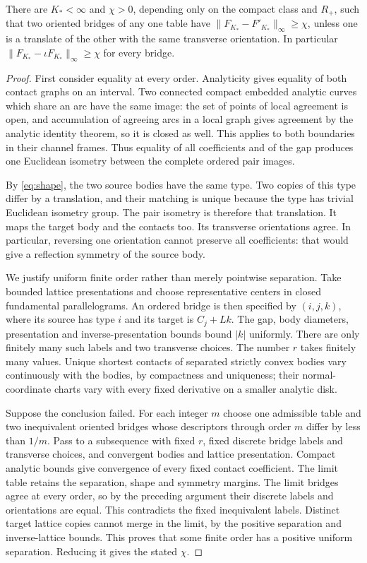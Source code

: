 \begin{lemma}
\label{lem:finite-separation}
There are $K_*<\infty$ and $\chi>0$, depending only on the compact
class and $R_+$, such that two oriented bridges of any one table have
$\|F_{K_*}-F'_{K_*}\|_\infty\ge\chi$, unless one is a translate
of the other with the same transverse orientation. In particular
$\|F_{K_*}-\iota F_{K_*}\|_\infty\ge\chi$ for every bridge.
\end{lemma}
\begin{proof}
First consider equality at every order. Analyticity gives equality of
both contact graphs on an interval. Two connected compact embedded
analytic curves which share an arc have the same image: the set of
points of local agreement is open, and accumulation of agreeing arcs
in a local graph gives agreement by the analytic identity theorem, so
it is closed as well. This applies to both boundaries in their channel
frames. Thus equality of all coefficients and of the gap produces one
Euclidean isometry between the complete ordered pair images.

By \eqref{eq:shape}, the two source bodies have the same type. Two
copies of this type differ by a translation, and their matching is
unique because the type has trivial Euclidean isometry group. The pair
isometry is therefore that translation. It maps the target body and the
contacts too. Its transverse orientations agree. In particular, reversing
one orientation cannot preserve all coefficients: that would give a
reflection symmetry of the source body.

We justify uniform finite order rather than merely pointwise separation.
Take bounded lattice presentations and choose representative centers in
closed fundamental parallelograms. An ordered bridge is then specified
by $(i,j,k)$, where its source has type $i$ and its target is $C_j+Lk$.
The gap, body diameters, presentation and inverse-presentation bounds
bound $|k|$ uniformly. There are only finitely many such labels and
two transverse choices. The number $r$ takes finitely many values.
Unique shortest contacts of separated strictly convex bodies vary
continuously with the bodies, by compactness and uniqueness; their
normal-coordinate charts vary with every fixed derivative on a smaller
analytic disk.

Suppose the conclusion failed. For each integer $m$ choose one admissible
table and two inequivalent oriented bridges whose descriptors through
order $m$ differ by less than $1/m$. Pass to a subsequence with fixed
$r$, fixed discrete bridge labels and transverse choices, and convergent
bodies and lattice presentation. Compact analytic bounds give convergence
of every fixed contact coefficient. The limit table retains the separation,
shape and symmetry margins. The limit bridges agree at every order, so
by the preceding argument their discrete labels and orientations are
equal. This contradicts the fixed inequivalent labels. Distinct target
lattice copies cannot merge in the limit, by the positive separation and
inverse-lattice bounds. This proves that some finite order has a positive
uniform separation. Reducing it gives the stated $\chi$.
\end{proof}

